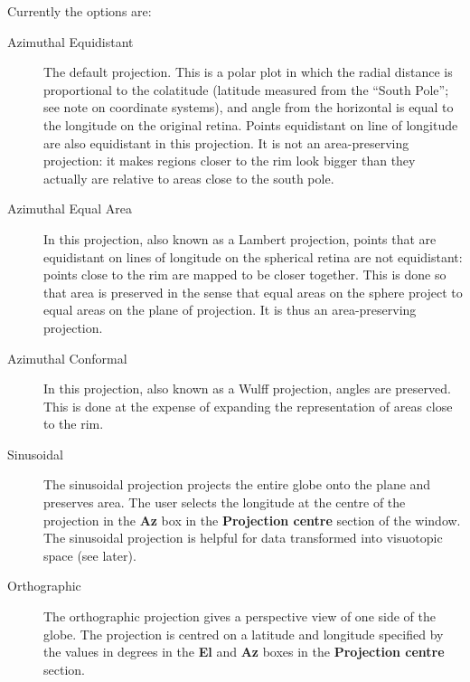 \documentclass{book}
\begin{document}
Currently the options are:
\begin{description}
\item[Azimuthal Equidistant] The default projection. This is a polar
  plot in which the radial distance is proportional to the colatitude
  (latitude measured from the ``South Pole''; see note on coordinate
  systems), and angle from the horizontal is equal to the longitude on
  the original retina. Points equidistant on line of longitude are
  also equidistant in this projection. It is not an area-preserving
  projection: it makes regions closer to the rim look bigger than they
  actually are relative to areas close to the south pole.
\item[Azimuthal Equal Area] In this projection, also known as a
  Lambert projection, %
  points that are
  equidistant on lines of longitude on the spherical retina are not
  equidistant: points close to the rim are mapped to be closer
  together. This is done so that area is preserved in the sense that
  equal areas on the sphere project to equal areas on the plane of
  projection. It is thus an area-preserving projection.
\item[Azimuthal Conformal] In this projection, also known as a Wulff
  projection, angles are preserved. This is done at the expense of
  expanding the representation of areas close to the rim.
\item[Sinusoidal] The sinusoidal projection projects the entire globe
  onto the plane and preserves area. The user selects the longitude at
  the centre of the projection in the \textbf{Az} box in the
  \textbf{Projection centre} section of the window. The sinusoidal
  projection is helpful for data transformed into visuotopic space
  (see later).
\item[Orthographic] The orthographic projection gives a perspective
  view of one side of the globe. The projection is centred on a
  latitude and longitude specified by the values in degrees in the
  \textbf{El} and \textbf{Az} boxes in the \textbf{Projection centre}
  section. %


\end{description}
\end{document}
